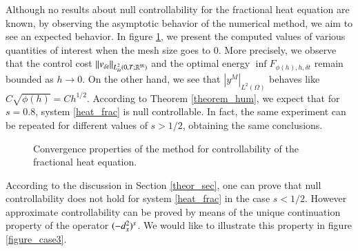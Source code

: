 Although no results about null controllability for the fractional heat equation are known, by observing the asymptotic behavior of the numerical method, we aim to see an expected behavior. In figure \ref{figure_case1}, we present the computed values of various quantities of interest when the mesh size goes to $0$. More precisely, we observe that the control cost $\|v_{\delta t}\|_{L^2_{\delta t}(0,T;\mathbb R^{\mathfrak{M}})}$ and the optimal energy $\inf F_{\phi(h),h,\delta t}$ remain bounded as $h\to 0$. On the other hand, we see that $|y^M|_{L^2(\Omega)}$ behaves like $C\sqrt{\phi(h)}=Ch^{1/2}$. According to Theorem \ref{theorem_hum}, we expect that for $s=0.8$, system \eqref{heat_frac} is null controllable. In fact, the same experiment can be repeated for different values of $s>1/2$, obtaining the same conclusions. 
%
\begin{figure}
  \centering
{}
\caption{Convergence properties of the method for controllability of the fractional heat equation. }\label{figure_case1}
\end{figure}

According to the discussion in Section \ref{theor_sec}, one can prove that null controllability does not hold for system \eqref{heat_frac} in the case $s<1/2$. However approximate controllability can be proved by means of the unique continuation property of the operator $(-d_x^2)^{s}$. We would like to illustrate this property in figure \ref{figure_case3}. 

